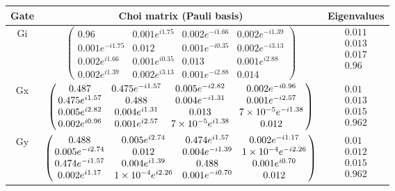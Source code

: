 {\begin{table}[h]
\begin{center}
\begin{tabular}[l]{|c|c|c|}
\hline
Gate & Choi matrix (Pauli basis) & Eigenvalues \\ \hline
Gi & $ \left(\!\!\begin{array}{cccc}
0.96 & 0.001e^{i1.75} & 0.002e^{-i1.66} & 0.002e^{-i1.39} \\ 
0.001e^{-i1.75} & 0.012 & 0.001e^{-i0.35} & 0.002e^{-i3.13} \\ 
0.002e^{i1.66} & 0.001e^{i0.35} & 0.013 & 0.001e^{i2.88} \\ 
0.002e^{i1.39} & 0.002e^{i3.13} & 0.001e^{-i2.88} & 0.014
 \end{array}\!\!\right) $
 & $ \begin{array}{c}
0.011 \\ 
0.013 \\ 
0.017 \\ 
0.96
 \end{array} $
 \\ \hline
Gx & $ \left(\!\!\begin{array}{cccc}
0.487 & 0.475e^{-i1.57} & 0.005e^{-i2.82} & 0.002e^{-i0.96} \\ 
0.475e^{i1.57} & 0.488 & 0.004e^{-i1.31} & 0.001e^{-i2.57} \\ 
0.005e^{i2.82} & 0.004e^{i1.31} & 0.013 & 7\times 10^{-5}e^{-i1.38} \\ 
0.002e^{i0.96} & 0.001e^{i2.57} & 7\times 10^{-5}e^{i1.38} & 0.012
 \end{array}\!\!\right) $
 & $ \begin{array}{c}
0.01 \\ 
0.013 \\ 
0.015 \\ 
0.962
 \end{array} $
 \\ \hline
Gy & $ \left(\!\!\begin{array}{cccc}
0.488 & 0.005e^{i2.74} & 0.474e^{i1.57} & 0.002e^{-i1.17} \\ 
0.005e^{-i2.74} & 0.012 & 0.004e^{-i1.39} & 1\times 10^{-4}e^{-i2.26} \\ 
0.474e^{-i1.57} & 0.004e^{i1.39} & 0.488 & 0.001e^{i0.70} \\ 
0.002e^{i1.17} & 1\times 10^{-4}e^{i2.26} & 0.001e^{-i0.70} & 0.012
 \end{array}\!\!\right) $
 & $ \begin{array}{c}
0.01 \\ 
0.012 \\ 
0.015 \\ 
0.962
 \end{array} $
 \\ \hline
\end{tabular}


\end{center}
\end{table}}
